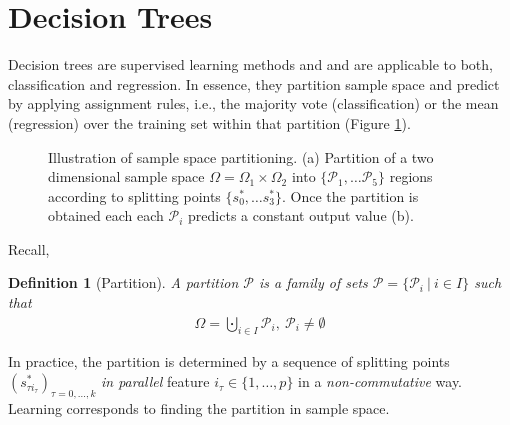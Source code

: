 \documentclass[12pt,a4paper]{article}
\newtheorem{definition}{Definition}
\begin{document}
\section{Decision Trees}
Decision trees \cite{breiman_random_forest, quinlan_programs_for_ml, understanding_random_forests, Ripley1995} are supervised learning methods and and are applicable to both, classification and regression. In essence, they partition sample space 
 and predict by applying assignment rules, i.e.,  the majority vote (classification) or the mean (regression) over the training set within that partition (Figure \ref{sample_space_partition}).
\begin{figure}\centering
\quad
{}
\caption{Illustration of sample space partitioning. (a) Partition of a two dimensional sample space $\Omega = \Omega_1 \times \Omega_2$ into $\{\mathcal P_1, \dots \mathcal P_5\}$ regions according to splitting points $\{s^*_0, \dots s^*_3\}$. Once the partition is obtained each each $\mathcal P_i$ predicts a constant output value (b).}
\label{sample_space_partition}
\end{figure}
 Recall, 
\begin{definition}[Partition]
	A partition $\mathcal P$ is a family of sets $\mathcal P = \{\mathcal P_i ~|~i\in I\}$ such that
	\begin{align*}
	\Omega = \bigcupdot_{i\in I} \mathcal P_i, ~ \mathcal P_i \neq \emptyset
	\end{align*}
\end{definition}
In practice, the partition is determined by a sequence of splitting points $(s^*_{\tau i_\tau})_{\tau = 0,\dots, k}$ \textit{in parallel} feature $i_\tau\in \{1,\dots, p\}$ in a \textit{non-commutative} way. Learning corresponds to finding the partition in sample space.
\end{document}

